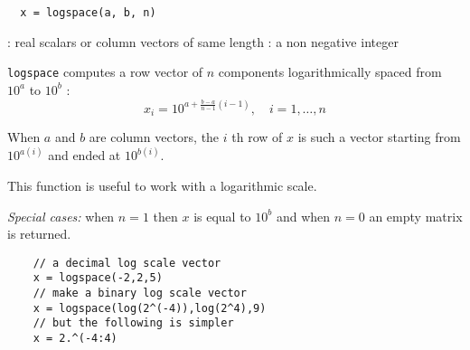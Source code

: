 \begin{mandesc}
\end{mandesc}
\begin{calling_sequence}
\begin{verbatim}
  x = logspace(a, b, n)
\end{verbatim}
\end{calling_sequence}

\begin{parameters}
  \begin{varlist}
    : real scalars or column vectors of same length
    : a non negative integer
  \end{varlist}
\end{parameters}
\begin{mandescription}
  \verb+logspace+ computes a row vector of $n$ components logarithmically spaced
  from $10^a$ to $10^b$ :
  $$
  x_i = 10^{a + \frac{b-a}{n-1} (i-1)}, \quad i = 1, \dots, n
  $$

  When $a$ and $b$ are column vectors, the $i$ th row of $x$ is such a vector
  starting from $10^{a(i)}$ and ended at $10^{b(i)}$.

  This function is useful to work with a logarithmic scale.

  {\em Special cases: } when $n=1$ then $x$ is equal to $10^b$ and when $n=0$ an empty matrix is returned.
\end{mandescription}

\begin{examples}
  \begin{Verbatim}
    // a decimal log scale vector
    x = logspace(-2,2,5)
    // make a binary log scale vector
    x = logspace(log(2^(-4)),log(2^4),9)
    // but the following is simpler
    x = 2.^(-4:4)
  \end{Verbatim}
\end{examples}

\begin{manseealso}
\end{manseealso}

